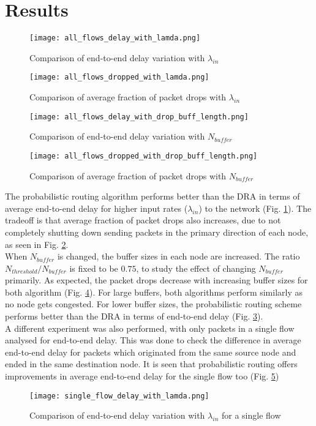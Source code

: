 \documentclass[10pt,conference, final, letterpaper]{IEEEtran}
\begin{document}
\section{Results}
\begin{figure}
	\texttt{[image: all\_flows\_delay\_with\_lamda.png]}
	\caption{Comparison of end-to-end delay variation with $\lambda_{in}$}
	\label{fig:delay_lamda_var}
\end{figure}
\begin{figure}
	\texttt{[image: all\_flows\_dropped\_with\_lamda.png]}
	\caption{Comparison of average fraction of packet drops with $\lambda_{in}$}
	\label{fig:dropped_lamda_var}
\end{figure}
\begin{figure}
	\texttt{[image: all\_flows\_delay\_with\_drop\_buff\_length.png]}
	\caption{Comparison of end-to-end delay variation with $N_{buffer}$}
	\label{fig:delay_drop_buff_var}
\end{figure}
\begin{figure}
	\texttt{[image: all\_flows\_dropped\_with\_drop\_buff\_length.png]}
	\caption{Comparison of average fraction of packet drops with $N_{buffer}$}
	\label{fig:dropped_drop_buff_var}
\end{figure}
The probabilistic routing algorithm performs better than the DRA in terms of average end-to-end delay for higher input rates ($\lambda_{in}$) to the network (Fig. \ref{fig:delay_lamda_var}). The tradeoff is that average fraction of packet drops also increases, due to not completely shutting down sending packets in the primary direction of each node, as seen in Fig. \ref{fig:dropped_lamda_var}.\\
When $N_{buffer}$ is changed, the buffer sizes in each node are increased. The ratio $N_{threshold}/N_{buffer}$ is fixed to be $0.75$, to study the effect of changing $N_{buffer}$ primarily. As expected, the packet drops decrease with increasing buffer sizes for both algorithm (Fig. \ref{fig:dropped_drop_buff_var}). For large buffers, both algorithms perform similarly as no node gets congested. For lower buffer sizes, the probabilistic routing scheme performs better than the DRA in terms of end-to-end delay (Fig. \ref{fig:delay_drop_buff_var}).\\
A different experiment was also performed, with only packets in a single flow analysed for end-to-end delay. This was done to check the difference in average end-to-end delay for packets which originated from the same source node and ended in the same destination node. It is seen that probabilistic routing offers improvements in average end-to-end delay for the single flow too (Fig. \ref{fig:single_lamda_var})\\
\begin{figure}
	\texttt{[image: single\_flow\_delay\_with\_lamda.png]}
	\caption{Comparison of end-to-end delay variation with $\lambda_{in}$ for a single flow}
	\label{fig:single_lamda_var}
\end{figure} 
\end{document}
